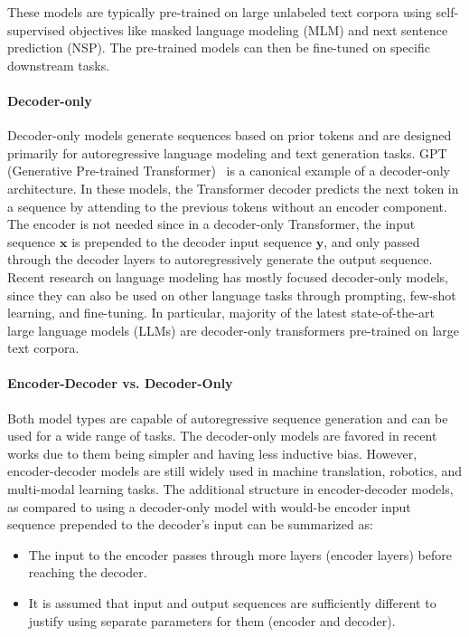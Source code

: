 These models are typically pre-trained on large unlabeled text corpora using self-supervised objectives like masked language modeling (MLM) and next sentence prediction (NSP). The pre-trained models can then be fine-tuned on specific downstream tasks.

\paragraph{Decoder-only}
Decoder-only models generate sequences based on prior tokens and are designed primarily for autoregressive language modeling and text generation tasks. GPT (Generative Pre-trained Transformer)~\cite{radford_improving_2018} is a canonical example of a decoder-only architecture. In these models, the Transformer decoder predicts the next token in a sequence by attending to the previous tokens without an encoder component. The encoder is not needed since in a decoder-only Transformer, the input sequence $\mathbf{x}$ is prepended to the decoder input sequence $\mathbf{y}$, and only passed through the decoder layers to autoregressively generate the output sequence. Recent research on language modeling has mostly focused decoder-only models, since they can also be used on other language tasks through prompting, few-shot learning, and fine-tuning. In particular, majority of the latest state-of-the-art large language models (LLMs) are decoder-only transformers pre-trained on large text corpora.

\paragraph{Encoder-Decoder vs. Decoder-Only} Both model types are capable of autoregressive sequence generation and can be used for a wide range of tasks. The decoder-only models are favored in recent works due to them being simpler and having less inductive bias. However, encoder-decoder models are still widely used in machine translation, robotics, and multi-modal learning tasks. The additional structure in encoder-decoder models, as compared to using a decoder-only model with would-be encoder input sequence prepended to the decoder's input can be summarized as:
\begin{itemize}
    \item The input to the encoder passes through more layers (encoder layers) before reaching the decoder.
    \item It is assumed that input and output sequences are sufficiently different to justify using separate parameters for them (encoder and decoder).
\end{itemize}

